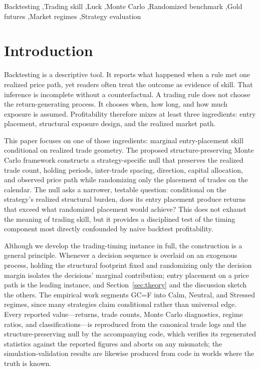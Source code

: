 \documentclass[preprint,12pt]{elsarticle}
\theoremstyle{definition}
\begin{document}
\begin{frontmatter}
\begin{keyword}
Backtesting \sep Trading skill \sep Luck \sep Monte Carlo \sep Randomized benchmark \sep Gold futures \sep Market regimes \sep Strategy evaluation
\end{keyword}

\end{frontmatter}

\section{Introduction}

Backtesting is a descriptive tool. It reports what happened when a rule met one realized price path, yet readers often treat the outcome as evidence of skill. That inference is incomplete without a counterfactual. A trading rule does not choose the return-generating process. It chooses when, how long, and how much exposure is assumed. Profitability therefore mixes at least three ingredients: entry placement, structural exposure design, and the realized market path.

This paper focuses on one of those ingredients: marginal entry-placement skill conditional on realized trade geometry. The proposed structure-preserving Monte Carlo framework constructs a strategy-specific null that preserves the realized trade count, holding periods, inter-trade spacing, direction, capital allocation, and observed price path while randomizing only the placement of trades on the calendar. The null asks a narrower, testable question: conditional on the strategy's realized structural burden, does its entry placement produce returns that exceed what randomized placement would achieve? This does not exhaust the meaning of trading skill, but it provides a disciplined test of the timing component most directly confounded by naive backtest profitability.

Although we develop the trading-timing instance in full, the construction is a general principle. Whenever a decision sequence is overlaid on an exogenous process, holding the structural footprint fixed and randomizing only the decision margin isolates the decisions' marginal contribution; entry placement on a price path is the leading instance, and Section~\ref{sec:theory} and the discussion sketch the others. The empirical work segments GC=F into Calm, Neutral, and Stressed regimes, since many strategies claim conditional rather than universal edge. Every reported value---returns, trade counts, Monte Carlo diagnostics, regime ratios, and classifications---is reproduced from the canonical trade logs and the structure-preserving null by the accompanying code, which verifies its regenerated statistics against the reported figures and aborts on any mismatch; the simulation-validation results are likewise produced from code in worlds where the truth is known.
\end{document}

